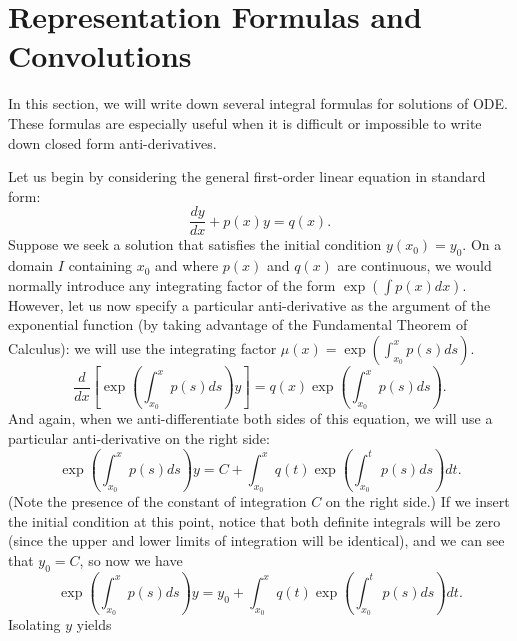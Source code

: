 \chapter{Representation Formulas and Convolutions}

\setcounter{example}{1}
\setcounter{exercise}{1}

{\begin{center}
\end{center}





In this section, we will write down several integral formulas for solutions of ODE.  These formulas are especially useful when it is difficult or impossible to write down closed form anti-derivatives.

Let us begin by considering the general first-order linear equation in standard form:
\[ \frac{dy}{dx}+p(x)y=q(x).\]
Suppose we seek a solution that satisfies the initial condition $y(x_0)=y_0$.  On a domain $I$ containing $x_0$ and where $p(x)$ and $q(x)$ are continuous, we would normally introduce any integrating factor of the form $\exp \left( \int p(x)dx \right)$.  However, let us now specify a particular anti-derivative as the argument of the exponential function (by taking advantage of the Fundamental Theorem of Calculus): we will use the integrating factor $\mu(x)=\exp \left( \int_{x_0}^x p(s)ds \right)$.
\[ \frac{d}{dx}\left[ \exp \left(\int_{x_0}^x p(s) ds \right) y \right] = q(x)\exp \left(\int_{x_0}^x p(s) ds \right).\]
And again, when we anti-differentiate both sides of this equation, we will use a particular anti-derivative on the right side:
\[ \exp \left( \int_{x_0}^x p(s) ds \right) y = C+\int_{x_0}^x q(t) \exp \left(\int_{x_0}^t p(s) ds \right)  dt. \]
(Note the presence of the constant of integration $C$ on the right side.)  
If we insert the initial condition at this point, notice that both definite integrals will be zero (since the upper and lower limits of integration will be identical), and we can see that $y_0=C$, so now we have
\[ \exp \left( \int_{x_0}^x p(s) ds \right) y = y_0+\int_{x_0}^x q(t) \exp \left(\int_{x_0}^t p(s) ds \right)  dt. \]
Isolating $y$ yields


}
